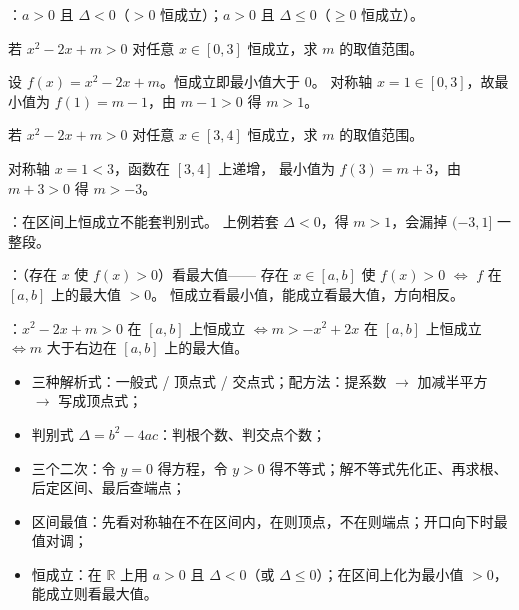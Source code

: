 \begin{procedure}
：$a>0$ 且 $\Delta<0$（$>0$ 恒成立）；$a>0$ 且 $\Delta\leq0$（$\geq0$ 恒成立）。

\begin{example}
若 $x^2-2x+m>0$ 对任意 $x\in[0,3]$ 恒成立，求 $m$ 的取值范围。
\end{example}
\begin{solution}
设 $f(x)=x^2-2x+m$。恒成立即最小值大于 $0$。
对称轴 $x=1\in[0,3]$，故最小值为 $f(1)=m-1$，由 $m-1>0$ 得 $m>1$。
\end{solution}

\begin{example}
若 $x^2-2x+m>0$ 对任意 $x\in[3,4]$ 恒成立，求 $m$ 的取值范围。
\end{example}
\begin{solution}
对称轴 $x=1<3$，函数在 $[3,4]$ 上递增，
最小值为 $f(3)=m+3$，由 $m+3>0$ 得 $m>-3$。
\end{solution}

：在区间上恒成立不能套判别式。
上例若套 $\Delta<0$，得 $m>1$，会漏掉 $(-3,1]$ 一整段。

：（存在 $x$ 使 $f(x)>0$）看最大值——
存在 $x\in[a,b]$ 使 $f(x)>0$ $\iff$ $f$ 在 $[a,b]$ 上的最大值 $>0$。
恒成立看最小值，能成立看最大值，方向相反。

：$x^2-2x+m>0$ 在 $[a,b]$ 上恒成立
$\iff m>-x^2+2x$ 在 $[a,b]$ 上恒成立 $\iff m$ 大于右边在 $[a,b]$ 上的最大值。

\end{procedure}

\begin{board}
\begin{itemize}
  \item 三种解析式：一般式 / 顶点式 / 交点式；配方法：提系数 $\to$ 加减半平方 $\to$ 写成顶点式；
  \item 判别式 $\Delta=b^2-4ac$：判根个数、判交点个数；
  \item 三个二次：令 $y=0$ 得方程，令 $y>0$ 得不等式；解不等式先化正、再求根、后定区间、最后查端点；
  \item 区间最值：先看对称轴在不在区间内，在则顶点，不在则端点；开口向下时最值对调；
  \item 恒成立：在 $\mathbb{R}$ 上用 $a>0$ 且 $\Delta<0$（或 $\Delta\leq0$）；在区间上化为最小值 $>0$，能成立则看最大值。
\end{itemize}
\end{board}


